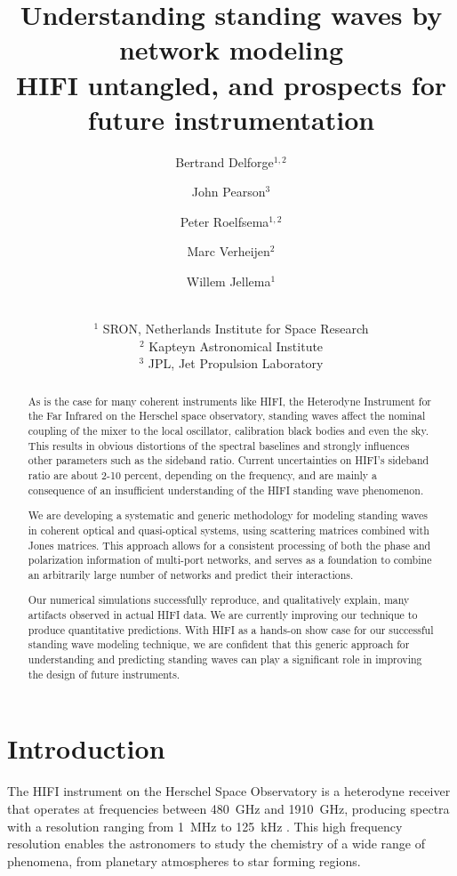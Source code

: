 \documentclass[a4paper,11pt]{article}
\title{Understanding standing waves by network modeling
\\
\large{HIFI untangled, and prospects for future instrumentation}}
\author{Bertrand Delforge$^{1, 2}$
       \and
       John Pearson$^3$
       \and
       Peter Roelfsema$^{1, 2}$
       \and
       Marc Verheijen$^2$
       \and
       Willem Jellema$^1$
       \and
       \\ \footnotesize $^1$ SRON, Netherlands Institute for Space Research
       \\ \footnotesize $^2$ Kapteyn Astronomical Institute
       \\ \footnotesize $^3$ JPL, Jet Propulsion Laboratory
}
\begin{document}
\maketitle

\begin{abstract}
As is the case for many coherent instruments like HIFI, the Heterodyne Instrument for the Far Infrared on the Herschel space observatory, standing waves affect the nominal coupling of the mixer to the local oscillator, calibration black bodies and even the sky.  This results in obvious distortions of the spectral baselines and strongly influences other parameters such as the sideband ratio.  Current uncertainties on HIFI's sideband ratio are about 2-10 percent, depending on the frequency, and are mainly a consequence of an insufficient understanding of the HIFI standing wave phenomenon.

We are developing a systematic and generic methodology for modeling standing waves in coherent optical and quasi-optical systems, using scattering matrices combined with Jones matrices.
This approach allows for a consistent processing of both the phase and polarization information of multi-port networks, and serves as a foundation to combine an arbitrarily large number of networks and predict their interactions.

Our numerical simulations successfully reproduce, and qualitatively explain, many artifacts observed in actual HIFI data.
We are currently improving our technique to produce quantitative predictions.
With HIFI as a hands-on show case for our successful standing wave modeling technique,
we are confident that this generic approach for understanding and predicting standing waves can play a significant role in improving the design of future instruments.
\end{abstract}






\section{Introduction}
The HIFI instrument on the Herschel Space Observatory \cite{AA_518_L1} is a heterodyne receiver that operates at frequencies between \SI{480}{\giga\hertz} and \SI{1910}{\giga\hertz},
producing spectra with a resolution ranging from \SI{1}{\mega\hertz} to \SI{125}{\kilo\hertz} \cite{AA_518_L6}.
This high frequency resolution enables the astronomers to study the chemistry of a wide range of phenomena, from planetary atmospheres to star forming regions.
\end{document}
